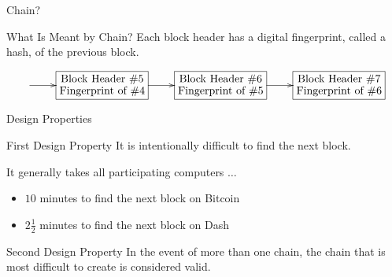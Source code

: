 \documentclass{beamer}
\begin{document}
\begin{frame}{Chain?}


  \begin{block}{What Is Meant by Chain?}
    Each block header has a digital fingerprint, called a hash, of the previous block.
  \end{block}
  \[
  \xymatrix{
    \ar[r] &  *+[F]{\txt{Block Header \#5\\ Fingerprint of \#4 
     }} \ar[r] & *+[F]{\txt{Block Header \#6\\ Fingerprint of \#5 
     }}  \ar[r]& *+[F]{\txt{Block Header \#7\\ Fingerprint of \#6 
     }} }
  
  \]

\end{frame}





\begin{frame}{Design Properties}


\begin{block}{First Design Property}
  It is intentionally difficult to find the next block.

  It generally takes all participating computers $\ldots$ 
  \pause
  \begin{itemize}
    \item $10$ minutes to find the next block on Bitcoin
    \item $2\frac{1}{2}$ minutes to find the next block on Dash
  \end{itemize}

\end{block}

\pause
  
  \begin{block}{Second Design Property}
    In the event of more than one chain, the chain that is most difficult to create is considered valid.
  \end{block}
  
\end{frame}
\end{document}
